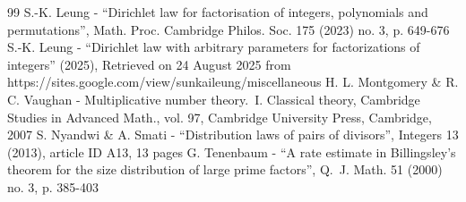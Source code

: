 \documentclass[10pt,a4paper]{article}
\theoremstyle{plain}
\theoremstyle{definition}
\begin{document}
\begin{thebibliography}{99}
 S.-K. Leung - “Dirichlet law for factorisation of integers, polynomials and permutations”, Math. Proc. Cambridge Philos. Soc. 175 (2023) no. 3, p. 649-676
 S.-K. Leung - “Dirichlet law with arbitrary parameters for factorizations of integers” (2025), Retrieved on 24 August 2025 from https://sites.google.com/view/sunkaileung/miscellaneous
 H. L. Montgomery \& R. C. Vaughan - Multiplicative number theory. I. Classical theory, Cambridge Studies in Advanced Math., vol. 97, Cambridge University Press, Cambridge, 2007
 S. Nyandwi \& A. Smati - “Distribution laws of pairs of divisors”, Integers 13 (2013), article ID A13, 13 pages
 G. Tenenbaum - “A rate estimate in Billingsley’s theorem for the size distribution of large prime factors”, Q. J. Math. 51 (2000) no. 3, p. 385-403
\end{thebibliography}
\end{document}
